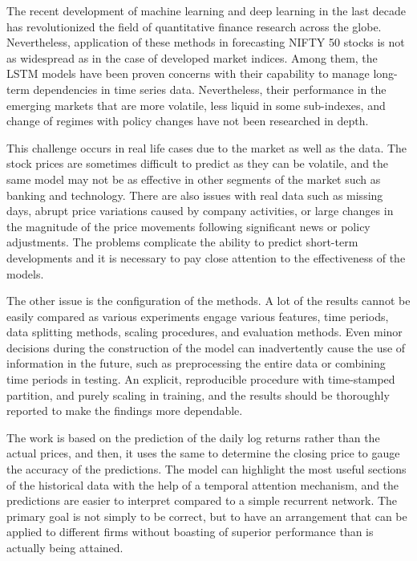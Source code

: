 \documentclass[conference]{IEEEtran}
\begin{document}
The recent development of machine learning and deep learning in the last decade has revolutionized the field of quantitative finance research across the globe. Nevertheless, application of these methods in forecasting NIFTY 50 stocks is not as widespread as in the case of developed market indices. Among them, the LSTM models have been proven concerns with their capability to manage long-term dependencies in time series data. Nevertheless, their performance in the emerging markets that are more volatile, less liquid in some sub-indexes, and change of regimes with policy changes have not been researched in depth.

This challenge occurs in real life cases due to the market as well as the data. The stock prices are sometimes difficult to predict as they can be volatile, and the same model may not be as effective in other segments of the market such as banking and technology. There are also issues with real data such as missing days, abrupt price variations caused by company activities, or large changes in the magnitude of the price movements following significant news or policy adjustments. The problems complicate the ability to predict short-term developments and it is necessary to pay close attention to the effectiveness of the models.

The other issue is the configuration of the methods. A lot of the results cannot be easily compared as various experiments engage various features, time periods, data splitting methods, scaling procedures, and evaluation methods. Even minor decisions during the construction of the model can inadvertently cause the use of information in the future, such as preprocessing the entire data or combining time periods in testing. An explicit, reproducible procedure with time-stamped partition, and purely scaling in training, and the results should be thoroughly reported to make the findings more dependable.

The work is based on the prediction of the daily log returns rather than the actual prices, and then, it uses the same to determine the closing price to gauge the accuracy of the predictions. The model can highlight the most useful sections of the historical data with the help of a temporal attention mechanism, and the predictions are easier to interpret compared to a simple recurrent network. The primary goal is not simply to be correct, but to have an arrangement that can be applied to different firms without boasting of superior performance than is actually being attained.
\end{document}
